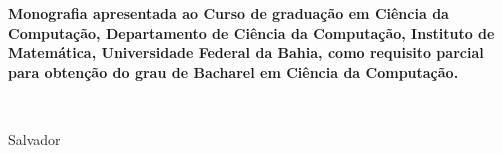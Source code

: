 

\begin{titlepage}
 \vfill
 \begin{center}
   {\large \uppercase{ \bf{ \meunome\ } } } \\[7cm]
   {\Huge \uppercase{ \bf{ \meutitulo\ } } }\\[1cm]
   \vfill
   \hspace{.45\textwidth} %
   \begin{minipage}{.5\textwidth}
     \begin{espacosimples}
       \bf{
  Monografia apresentada ao Curso de graduação em Ciência da Computação, 
  Departamento de Ciência da Computação, Instituto de Matemática,  Universidade Federal da 
  Bahia, como requisito parcial para obtenção do grau de Bacharel em  Ciência da Computação. \\ 
       }      
     \end{espacosimples}
     \begin{espacosimples}    
       \meuorientador \\
       \meucoorientador
     \end{espacosimples}
   \end{minipage}
   \vfill
   Salvador \\
   \meuano
 \end{center}
\end{titlepage}
